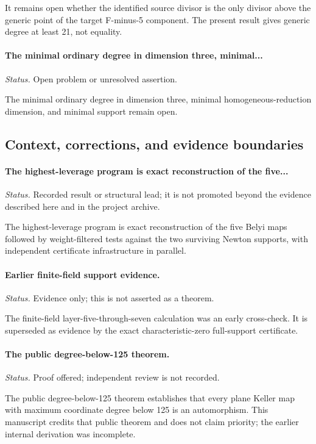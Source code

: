 It remains open whether the identified source divisor is the only divisor above the generic point of the target F-minus-5 component.  The present result gives generic degree at least 21, not equality.

\label{supp-note-06-047}
\paragraph{The minimal ordinary degree in dimension three, minimal...}
\emph{Status.} Open problem or unresolved assertion.

The minimal ordinary degree in dimension three, minimal homogeneous-reduction dimension, and minimal support remain open.

\subsection{Context, corrections, and evidence boundaries}

\label{supp-note-06-048}
\paragraph{The highest-leverage program is exact reconstruction of the five...}
\emph{Status.} Recorded result or structural lead; it is not promoted beyond the evidence described here and in the project archive.

The highest-leverage program is exact reconstruction of the five Belyi maps followed by weight-filtered tests against the two surviving Newton supports, with independent certificate infrastructure in parallel.

\label{supp-note-06-049}
\paragraph{Earlier finite-field support evidence.}
\emph{Status.} Evidence only; this is not asserted as a theorem.

The finite-field layer-five-through-seven calculation was an early cross-check.  It is superseded as evidence by the exact characteristic-zero full-support certificate.

\label{supp-note-06-050}
\paragraph{The public degree-below-125 theorem.}
\emph{Status.} Proof offered; independent review is not recorded.

The public degree-below-125 theorem establishes that every plane Keller map with maximum coordinate degree below 125 is an automorphism.  This manuscript credits that public theorem and does not claim priority; the earlier internal derivation was incomplete.

\endgroup
